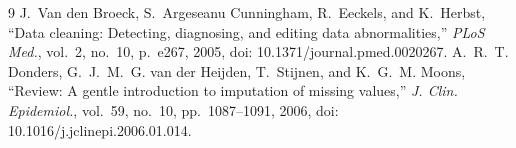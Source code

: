 \documentclass[12pt,a4paper]{article}
\begin{document}
\setcounter{section}{2}


\begin{thebibliography}{9}
   J.~Van den Broeck, S.~Argeseanu Cunningham, R.~Eeckels, and
    K.~Herbst, ``Data cleaning: Detecting, diagnosing, and editing data abnormalities,''
    \emph{PLoS Med.}, vol.~2, no.~10, p.~e267, 2005, doi: 10.1371/journal.pmed.0020267.
   A.~R.~T. Donders, G.~J.~M.~G. van der Heijden, T.~Stijnen, and
    K.~G.~M. Moons, ``Review: A gentle introduction to imputation of missing values,''
    \emph{J. Clin. Epidemiol.}, vol.~59, no.~10, pp.~1087--1091, 2006,
    doi: 10.1016/j.jclinepi.2006.01.014.
\end{thebibliography}
\end{document}
